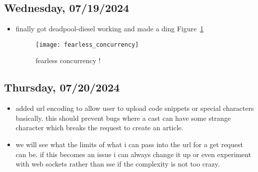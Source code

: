 \subsection*{Wednesday, 07/19/2024}
\begin{itemize}
    \item finally got deadpool-diesel working and made a ding
        Figure~\ref{fig:fearless_concurrency}
        \begin{figure}[ht]
            \centering
            \texttt{[image: fearless\_concurrency]}
            \captionsetup{labelfont=bf, textfont=it}
            \caption{fearless concurrency !}
            \label{fig:fearless_concurrency}
        \end{figure}
\end{itemize}

\clearpage
\subsection*{Thursday, 07/20/2024}
\begin{itemize}
    \item added url encoding to allow user to upload code snippets or special
        characters basically. this should prevent bugs where a cast can have
        some strange character which breaks the request to create an article.
    \item we will see what the limits of what i can pass into the url for a get
        request can be. if this becomes an issue i can always change it up or
        even experiment with web sockets rather than sse if the complexity is
        not too crazy.
\end{itemize}

\clearpage
